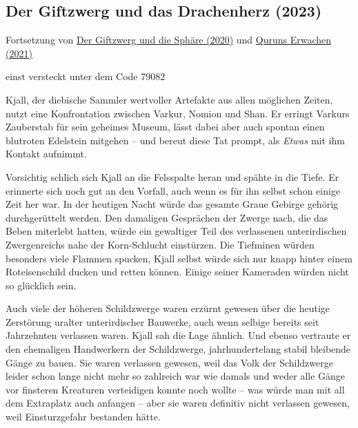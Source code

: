 \begin{chapterbox}
    \chapter{Der Giftzwerg und das Drachenherz (2023)}
    \label{2023-der-giftzwerg-und-das-drachenherz}

    \begin{center}
        Fortsetzung von \hyperref[2020-der-giftzwerg-und-die-sphaere]{Der Giftzwerg und die Sphäre (2020)} und \hyperref[2021-quruns-erwachen]{Quruns Erwachen (2021)}
        
        einst versteckt unter dem Code 79082
    \end{center}
    
    Kjall, der diebische Sammler wertvoller Artefakte aus allen möglichen Zeiten, nutzt eine Konfrontation zwischen Varkur, Nomion und Shan. Er erringt Varkurs Zauberstab für sein geheimes Museum, lässt dabei aber auch spontan einen blutroten Edelstein mitgehen – und bereut diese Tat prompt, als \textit{Etwas} mit ihm Kontakt aufnimmt.

    
    
    
\end{chapterbox}





\newpage
{}

Vorsichtig schlich sich Kjall an die Felsspalte heran und spähte in die Tiefe. Er erinnerte sich noch gut an den Vorfall, auch wenn es für ihn selbst schon einige Zeit her war. In der heutigen Nacht würde das gesamte Graue Gebirge gehörig durchgerüttelt werden. Den damaligen Gesprächen der Zwerge nach, die das Beben miterlebt hatten, würde ein gewaltiger Teil des verlassenen unterirdischen Zwergenreichs nahe der Korn-Schlucht einstürzen. Die Tiefminen würden besonders viele Flammen spucken, Kjall selbst würde sich nur knapp hinter einem Roteisenschild ducken und retten können. Einige seiner Kameraden würden nicht so glücklich sein.

Auch viele der höheren Schildzwerge waren erzürnt gewesen über die heutige Zerstörung uralter unterirdischer Bauwerke, auch wenn selbige bereits seit Jahrzehnten verlassen waren. Kjall sah die Lage ähnlich. Und ebenso vertraute er den ehemaligen Handwerkern der Schildzwerge, jahrhundertelang stabil bleibende Gänge zu bauen. Sie waren verlassen gewesen, weil das Volk der Schildzwerge leider schon lange nicht mehr so zahlreich war wie damals und weder alle Gänge vor finsteren Kreaturen verteidigen konnte noch wollte – was würde man mit all dem Extraplatz auch anfangen – aber sie waren definitiv nicht verlassen gewesen, weil Einsturzgefahr bestanden hätte.

